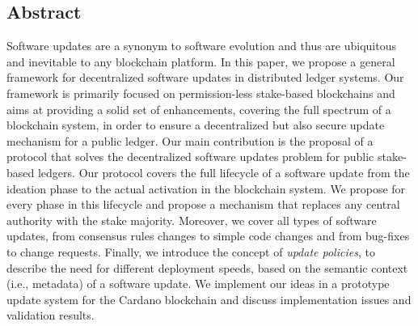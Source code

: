 \subsection*{Abstract}
Software updates are a synonym to software evolution and thus are ubiquitous and inevitable to any blockchain platform. In this paper, we propose a general framework for decentralized software updates in distributed ledger systems. Our framework is primarily focused on permission-less stake-based blockchains and aims at providing a solid set of enhancements, covering the full spectrum of a blockchain system, in order to ensure a decentralized but also secure update mechanism for a public ledger. 
Our main contribution is the proposal of a protocol that solves the decentralized software updates problem for public stake-based ledgers. Our protocol covers the full lifecycle of a software update from the ideation phase to the actual activation in the blockchain system. We propose  for every phase in this lifecycle and propose a mechanism that replaces any central authority with the stake majority. Moreover, we cover all types of software updates, from consensus rules changes to simple code changes and from bug-fixes to change requests. Finally, we introduce the concept of \emph{update policies}, to describe the need for different deployment speeds, based on the semantic context (i.e., metadata) of a software update. We implement our ideas in a prototype update system for the Cardano blockchain and discuss implementation issues and validation results.




